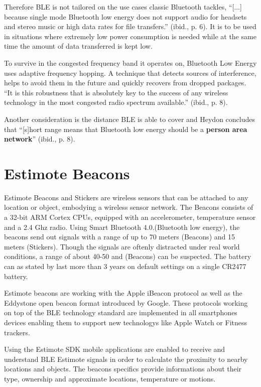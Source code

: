 Therefore BLE is not tailored on the use cases classic Bluetooth tackles, \enquote{[...] because single mode Bluetooth low energy does not support audio for headsets and stereo music or high data rates for file transfers.} (ibid., p. 6). It is to be used in situations where extremely low power consumption is needed while at the same time the amount of data transferred is kept low.

To survive in the congested frequency band it operates on, Bluetooth Low Energy uses adaptive frequency hopping. A technique that detects sources of interference, helps to avoid them in the future and quickly recovers from dropped packages. \enquote{It is this robustness that is absolutely key to the success of any wireless technology in the most congested radio spectrum available.} (ibid., p. 8).

Another consideration is the distance BLE is able to cover and Heydon concludes that \enquote{[s]hort range means that Bluetooth low energy should be a \textbf{person area network}} (ibid., p. 8).


\vspace{0.5cm}

\section{Estimote Beacons}

Estimote Beacons and Stickers are wireless sensors that can be attached to any location or object, embodying a wireless sensor network. The Beacons consists of a 32-bit ARM Cortex CPUs, equipped with an accelerometer, temperature sensor and a 2.4 Ghz radio. Using Smart Bluetooth 4.0.(Bluetooth low energy), the beacons send out signals with a range of up to 70 meters (Beacons) and 15 meters (Stickers). Though the signals are oftenly distracted under real world conditions, a range of about 40-50 and (Beacons) can be suspected. The battery can as stated by \cite{developerDocsEstimote} last more than 3 years on default settings on a single CR2477 battery.

Estimote beacons are working with the Apple iBeacon protocol as well as the Eddystone  open beacon format introduced by Google. These protocols working on top of the BLE technology standard are implemented in all smartphones devices enabling them to support new technologys like Apple Watch or Fitness trackers.

Using the Estimote SDK \cite{developerDocsEstimote} mobile applications are enabled to receive and understand BLE Estimote signals in order to calculate the proximity to nearby locations and objects. The beacons specifics provide informations about their type, ownership and approximate locations, temperature or motions.

